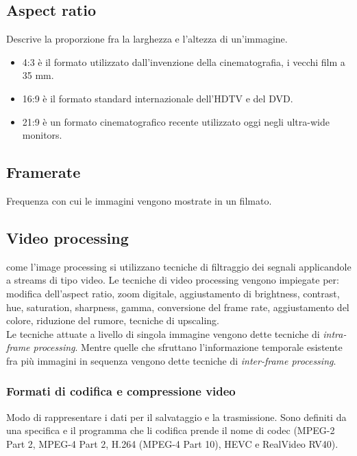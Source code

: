 \documentclass[8pt,a4paper]{article}
\begin{document}
\begin{multicols}{5}
    \subsection{Aspect ratio}
    Descrive la proporzione fra la larghezza e l’altezza di un’immagine.
    \begin{itemize}
      \item 4:3 è il formato utilizzato dall’invenzione della cinematografia, i vecchi 
      film a 35 mm.
      \item 16:9 è il formato standard internazionale dell’HDTV e del DVD.
      \item 21:9 è un formato cinematografico recente utilizzato oggi negli 
      ultra-wide monitors.
    \end{itemize}
    
    \subsection{Framerate}
    Frequenza con cui le immagini vengono mostrate in un filmato. 

    \subsection{Video processing}  come l’image processing si utilizzano tecniche di 
    filtraggio dei segnali applicandole a streams di tipo video. Le tecniche di video 
    processing vengono impiegate per: modifica dell’aspect ratio, zoom digitale, 
    aggiustamento di brightness, contrast, hue, saturation, sharpness, gamma, 
    conversione del frame rate, aggiustamento del colore, riduzione del rumore, 
    tecniche di upscaling. \\
    Le tecniche attuate a livello di singola immagine vengono dette tecniche di 
    \textit{intra-frame processing}. Mentre quelle che sfruttano l’informazione 
    temporale esistente fra più immagini in sequenza vengono dette tecniche di 
    \textit{inter-frame processing}.

    \subsubsection{Formati di codifica e compressione video}
    Modo di rappresentare i dati per il salvataggio e la trasmissione. Sono 
    definiti da una specifica e il programma che li codifica prende il nome di 
    codec (MPEG-2 Part 2, MPEG-4 Part 2, H.264 (MPEG-4 Part 10), HEVC e RealVideo RV40).


\end{multicols}
\end{document}

